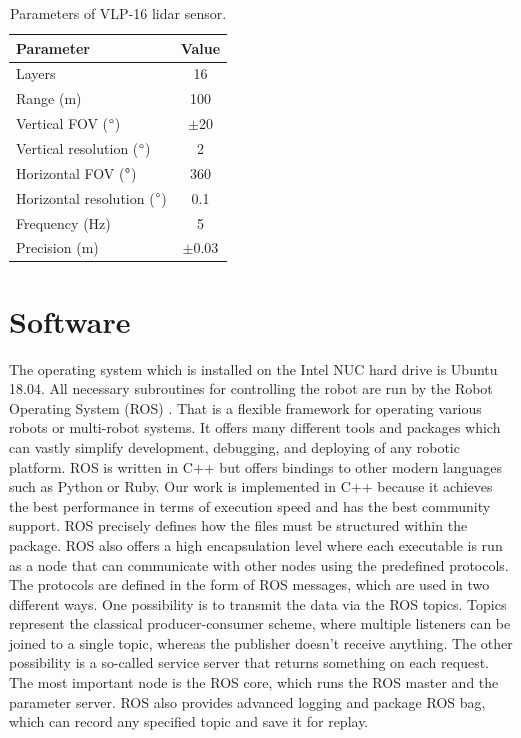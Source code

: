\begin{table}[H]
\centering
\begin{tabular}{lc}
\toprule
Parameter & Value \\
\midrule
Layers                            & 16   \\ 
Range (m)                         & 100  \\
Vertical FOV ($\degree$)          & $\pm20$   \\ 
Vertical resolution ($\degree$)   & 2    \\ 
Horizontal FOV ($\degree$)        & 360  \\ 
Horizontal resolution ($\degree$) & 0.1  \\ 
Frequency (Hz)                    & 5    \\ 
Precision (m)                     & $\pm0.03$ \\ 
\bottomrule
\end{tabular}
\caption{Parameters of VLP-16 lidar sensor.}
\label{tab:lidar}
\end{table}

\section{Software}
The operating system which is installed on the Intel NUC hard drive is Ubuntu 18.04. All necessary subroutines for controlling the robot are run by the Robot Operating System (ROS) \cite{ros}. That is a flexible framework for operating various robots or multi-robot systems. It offers many different tools and packages which can vastly simplify development, debugging, and deploying of any robotic platform. ROS is written in C++ but offers bindings to other modern languages such as Python or Ruby. Our work is implemented in C++ because it achieves the best performance in terms of execution speed and has the best community support. ROS precisely defines how the files must be structured within the package. ROS also offers a high encapsulation level where each executable is run as a node that can communicate with other nodes using the predefined protocols. The protocols are defined in the form of ROS messages, which are used in two different ways. One possibility is to transmit the data via the ROS topics. Topics represent the classical producer-consumer scheme, where multiple listeners can be joined to a single topic, whereas the publisher doesn't receive anything. The other possibility is a so-called service server that returns something on each request. The most important node is the ROS core, which runs the ROS master and the parameter server. ROS also provides advanced logging and package ROS bag, which can record any specified topic and save it for replay.

